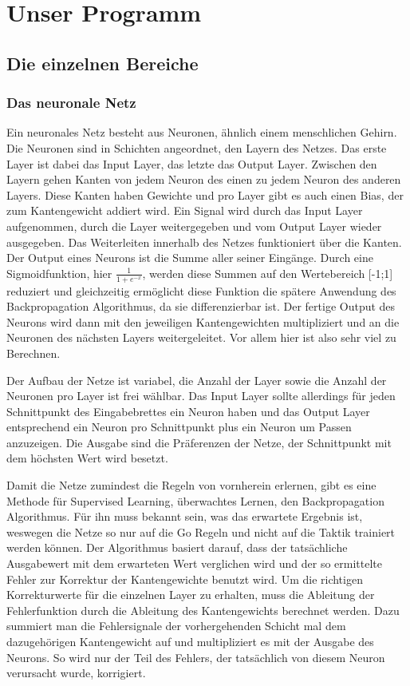 \section{Unser Programm}

\subsection{Die einzelnen Bereiche}

\subsubsection{Das neuronale Netz}

Ein neuronales Netz besteht aus Neuronen, ähnlich einem menschlichen Gehirn. Die
Neuronen sind in Schichten angeordnet, den Layern des Netzes. Das erste Layer
ist dabei das Input Layer, das letzte das Output Layer. Zwischen den Layern
gehen Kanten von jedem Neuron des einen zu jedem Neuron des anderen Layers.
Diese Kanten haben Gewichte und pro Layer gibt es auch einen Bias, der zum
Kantengewicht addiert wird. Ein Signal wird durch das Input Layer aufgenommen,
durch die Layer weitergegeben und vom Output Layer wieder ausgegeben. Das
Weiterleiten innerhalb des Netzes funktioniert über die Kanten. Der Output eines
Neurons ist die Summe aller seiner Eingänge. Durch eine Sigmoidfunktion, hier
$\frac{1}{1 + e^{-x}}$, werden diese Summen auf den Wertebereich [-1;1]
reduziert und gleichzeitig ermöglicht diese Funktion die spätere Anwendung des
Backpropagation Algorithmus, da sie differenzierbar ist. Der fertige Output des
Neurons wird dann mit den jeweiligen Kantengewichten multipliziert und an die
Neuronen des nächsten Layers weitergeleitet. Vor allem hier ist also sehr viel
zu Berechnen. 

Der Aufbau der Netze ist variabel, die Anzahl der Layer sowie die Anzahl der
Neuronen pro Layer ist frei wählbar. Das Input Layer sollte allerdings für jeden
Schnittpunkt des Eingabebrettes ein Neuron haben und das Output Layer
entsprechend ein Neuron pro Schnittpunkt plus ein Neuron um Passen anzuzeigen.
Die Ausgabe sind die Präferenzen der Netze, der Schnittpunkt mit dem höchsten
Wert wird besetzt. 

Damit die Netze zumindest die Regeln von vornherein erlernen, gibt es eine
Methode für Supervised Learning, überwachtes Lernen, den Backpropagation
Algorithmus. Für ihn muss bekannt sein, was das erwartete Ergebnis ist, weswegen
die Netze so nur auf die Go Regeln und nicht auf die Taktik trainiert werden
können. Der Algorithmus basiert darauf, dass der tatsächliche Ausgabewert mit
dem erwarteten Wert verglichen wird und der so ermittelte Fehler zur Korrektur
der Kantengewichte benutzt wird. Um die richtigen Korrekturwerte für die
einzelnen Layer zu erhalten, muss die Ableitung der Fehlerfunktion durch die
Ableitung des Kantengewichts berechnet werden. Dazu summiert man die
Fehlersignale der vorhergehenden Schicht mal dem dazugehörigen Kantengewicht auf
und multipliziert es mit der Ausgabe des Neurons. So wird nur der Teil des
Fehlers, der tatsächlich von diesem Neuron verursacht wurde, korrigiert. 

